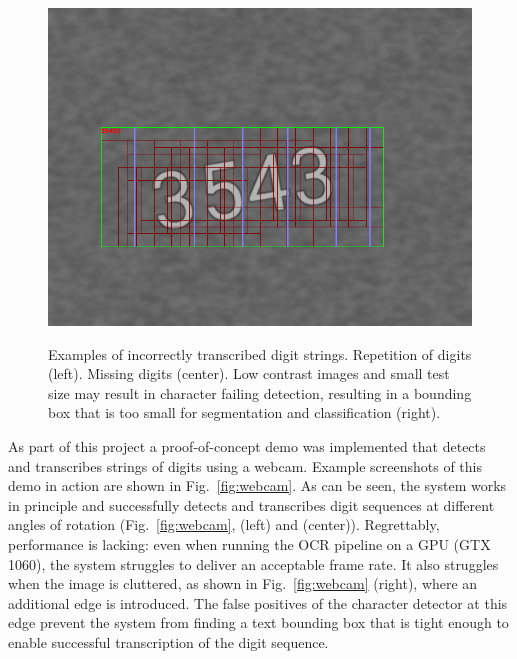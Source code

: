 \documentclass[12pt]{article}
\newcommand\figref[1]{Fig.~\ref{fig:#1}}
\begin{document}
\begin{figure}[ht!]
{        \includegraphics[width=0.35\linewidth]{fig/bad_examples_pipeline/cc904d6d-5202-422b-9a31-e8e49ddad840}
    }
    \caption{
      Examples of incorrectly transcribed digit strings. Repetition of digits (left).
      Missing digits (center). Low contrast images and small test size may result in character failing detection,
      resulting in a bounding box that is too small for segmentation and classification (right).
    }
    \label{fig:bad_examples_pipeline}
\end{figure}

As part of this project a proof-of-concept demo was implemented that detects and transcribes
strings of digits using a webcam. Example screenshots of this demo in action are shown in \figref{webcam}. As can be seen,
the system works in principle and successfully detects and transcribes digit sequences at
different angles of rotation (\figref{webcam}, (left) and (center)).
Regrettably, performance is lacking: even when running the OCR pipeline on a GPU (GTX 1060), the system struggles to deliver an acceptable frame rate.
It also struggles when the image is cluttered, as shown in \figref{webcam} (right), where
an additional edge is introduced. The false positives of the character detector at this edge
prevent the system from finding a text bounding box that is tight enough to enable successful transcription
of the digit sequence.
\end{document}
